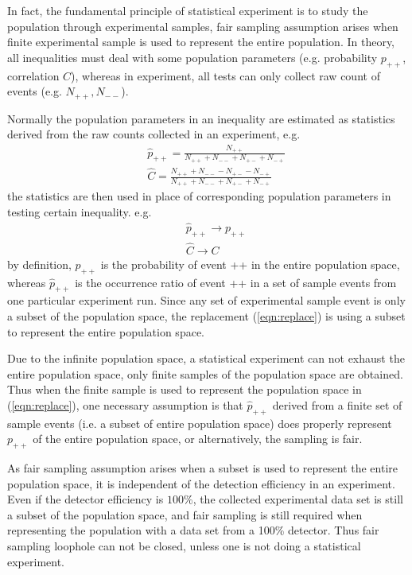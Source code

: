 \documentclass[prd,showpacs,twocolumn]{revtex4-1}
\begin{document}
In fact, the fundamental principle of statistical experiment is to study the population through experimental samples, fair sampling assumption arises when finite experimental sample is used to represent the entire population. In theory, all inequalities must deal with some population parameters (e.g. probability $p_{++}$, correlation $C$), whereas in experiment, all tests can only collect raw count of events (e.g. $N_{++},N_{--}$).

Normally the population parameters in an inequality are estimated as statistics derived from the raw counts collected in an experiment, e.g.
\begin{eqnarray}
&&\hat{p}_{++}=\frac{N_{++}}{N_{++}+N_{--}+N_{+-}+N_{-+}}\nonumber\\
&&\hat{C}=\frac{N_{++}+N_{--}-N_{+-}-N_{-+}}{N_{++}+N_{--}+N_{+-}+N_{-+}}
\label{eqn:estimate}
\end{eqnarray}
the statistics are then used in place of corresponding population parameters in testing certain inequality. e.g.
\begin{eqnarray}
&&\hat{p}_{++}\rightarrow p_{++}\nonumber\\
&&\hat{C}\rightarrow C
\label{eqn:replace}
\end{eqnarray}
by definition, $p_{++}$ is the probability of event ++ in the entire population space, whereas $\hat{p}_{++}$ is the occurrence ratio of event ++ in a set of sample events from one particular experiment run. Since any set of experimental sample event is only a subset of the population space, the replacement (\ref{eqn:replace}) is using a subset to represent the entire population space.

Due to the infinite population space, a statistical experiment can not exhaust the entire population space, only finite samples of the population space are obtained. Thus when the finite sample is used to represent the population space in (\ref{eqn:replace}), one necessary assumption is that $\hat{p}_{++}$ derived from a finite set of sample events (i.e. a subset of entire population space) does properly represent $p_{++}$ of the entire population space, or alternatively, the sampling is fair.

As fair sampling assumption arises when a subset is used to represent the entire population space, it is independent of the detection efficiency in an experiment. Even if the detector efficiency is $100\%$, the collected experimental data set is still a subset of the population space, and fair sampling is still required when representing the population with a data set from a 100\% detector. Thus fair sampling loophole can not be closed, unless one is not doing a statistical experiment.
\end{document}
